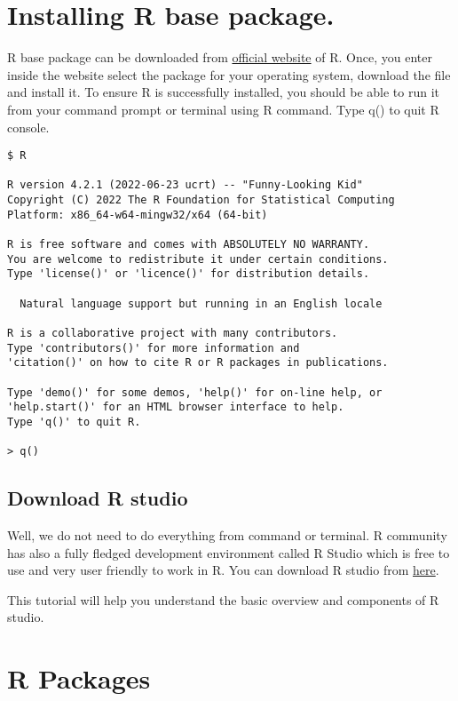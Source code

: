 \documentclass[
]{book}
\begin{document}
\hypertarget{installing-r-base-package.}{%
\section{Installing R base package.}\label{installing-r-base-package.}}

R base package can be downloaded from \href{https://cran.r-project.org/}{official website} of R. Once, you enter inside the website select the package for your operating system, download the file and install it. To ensure R is successfully installed, you should be able to run it from your command prompt or terminal using R command. Type q() to quit R console.

\begin{verbatim}
$ R

R version 4.2.1 (2022-06-23 ucrt) -- "Funny-Looking Kid"
Copyright (C) 2022 The R Foundation for Statistical Computing
Platform: x86_64-w64-mingw32/x64 (64-bit)

R is free software and comes with ABSOLUTELY NO WARRANTY.
You are welcome to redistribute it under certain conditions.
Type 'license()' or 'licence()' for distribution details.

  Natural language support but running in an English locale

R is a collaborative project with many contributors.
Type 'contributors()' for more information and
'citation()' on how to cite R or R packages in publications.

Type 'demo()' for some demos, 'help()' for on-line help, or
'help.start()' for an HTML browser interface to help.
Type 'q()' to quit R.

> q()
\end{verbatim}

\hypertarget{download-r-studio}{%
\subsection{Download R studio}\label{download-r-studio}}

Well, we do not need to do everything from command or terminal. R community has also a fully fledged development environment called R Studio which is free to use and very user friendly to work in R. You can download R studio from \href{https://posit.co/download/rstudio-desktop/}{here}.

This tutorial will help you understand the basic overview and components of R studio.

\hypertarget{r-packages}{%
\section{R Packages}\label{r-packages}}
\end{document}
